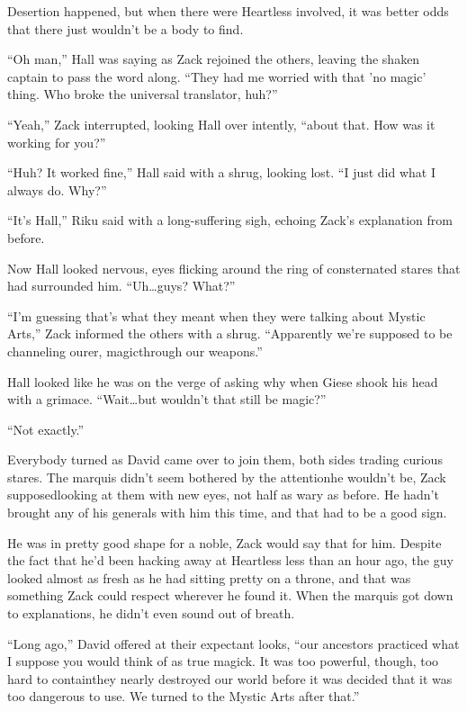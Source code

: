 Desertion happened, but when there were Heartless involved, it was better odds that there just wouldn't be a body to find.

``Oh man,'' Hall was saying as Zack rejoined the others, leaving the shaken captain to pass the word along. ``They had me worried with that 'no magic' thing. Who broke the universal translator, huh?''

``Yeah,'' Zack interrupted, looking Hall over intently, ``about that. How was it working for you?''

``Huh? It worked fine,'' Hall said with a shrug, looking lost. ``I just did what I always do. Why?''

``It's Hall,'' Riku said with a long-suffering sigh, echoing Zack's explanation from before.

Now Hall looked nervous, eyes flicking around the ring of consternated stares that had surrounded him. ``Uh\ldots guys? What?''

``I'm guessing that's what they meant when they were talking about Mystic Arts,'' Zack informed the others with a shrug. ``Apparently we're supposed to be channeling our\textemdash er, magic\textemdash through our weapons.''

Hall looked like he was on the verge of asking why when Giese shook his head with a grimace. ``Wait\ldots but wouldn't that still be magic?''

``Not exactly.''

Everybody turned as David came over to join them, both sides trading curious stares. The marquis didn't seem bothered by the attention\textemdash he wouldn't be, Zack supposed\textemdash looking at them with new eyes, not half as wary as before. He hadn't brought any of his generals with him this time, and that had to be a good sign.

He was in pretty good shape for a noble, Zack would say that for him. Despite the fact that he'd been hacking away at Heartless less than an hour ago, the guy looked almost as fresh as he had sitting pretty on a throne, and that was something Zack could respect wherever he found it. When the marquis got down to explanations, he didn't even sound out of breath.

``Long ago,'' David offered at their expectant looks, ``our ancestors practiced what I suppose you would think of as true magick. It was too powerful, though, too hard to contain\textemdash they nearly destroyed our world before it was decided that it was too dangerous to use. We turned to the Mystic Arts after that.''


